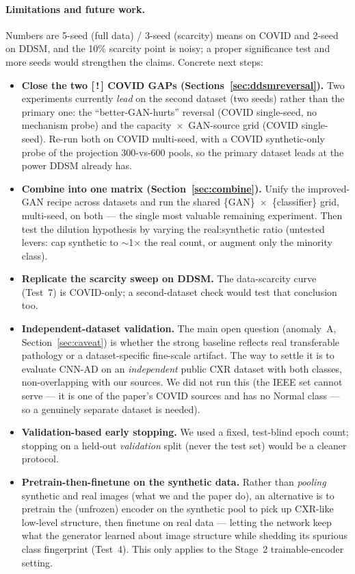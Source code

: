 \documentclass[11pt]{article}
\begin{document}
\paragraph{Limitations and future work.} Numbers are 5-seed (full data) / 3-seed
(scarcity) means on COVID and 2-seed on DDSM, and the 10\% scarcity point is noisy; a
proper significance test and more seeds would strengthen the claims. Concrete next
steps:
\begin{itemize}[nosep,leftmargin=1.4em]
  \item \textbf{Close the two [\,!\,] COVID GAPs (Sections~\ref{sec:ddsmreversal}).}
        Two experiments currently \emph{lead} on the second dataset (two seeds) rather
        than the primary one: the ``better-GAN-hurts'' reversal (COVID single-seed, no
        mechanism probe) and the capacity~$\times$~GAN-source grid (COVID single-seed).
        Re-run both on COVID multi-seed, with a COVID synthetic-only probe of the
        projection 300-vs-600 pools, so the primary dataset leads at the power DDSM
        already has.
  \item \textbf{Combine into one matrix (Section~\ref{sec:combine}).} Unify the
        improved-GAN recipe across datasets and run the shared \{GAN\}~$\times$~\{classifier\}
        grid, multi-seed, on both --- the single most valuable remaining experiment.
        Then test the dilution hypothesis by varying the real:synthetic ratio (untested
        levers: cap synthetic to $\sim$1$\times$ the real count, or augment only the
        minority class).
  \item \textbf{Replicate the scarcity sweep on DDSM.} The data-scarcity curve
        (Test~7) is COVID-only; a second-dataset check would test that conclusion too.
  \item \textbf{Independent-dataset validation.} The main open question (anomaly~A,
        Section~\ref{sec:caveat}) is whether the strong baseline reflects real
        transferable pathology or a dataset-specific fine-scale artifact. The way to
        settle it is to evaluate CNN-AD on an \emph{independent} public CXR dataset
        with both classes, non-overlapping with our sources. We did not run this
        (the IEEE set cannot serve --- it is one of the paper's COVID sources and
        has no Normal class --- so a genuinely separate dataset is needed).
  \item \textbf{Validation-based early stopping.} We used a fixed, test-blind epoch
        count; stopping on a held-out \emph{validation} split (never the test set)
        would be a cleaner protocol.
  \item \textbf{Pretrain-then-finetune on the synthetic data.} Rather than
        \emph{pooling} synthetic and real images (what we and the paper do), an
        alternative is to pretrain the (unfrozen) encoder on the synthetic pool to
        pick up CXR-like low-level structure, then finetune on real data ---
        letting the network keep what the generator learned about image structure
        while shedding its spurious class fingerprint (Test~4). This only applies to
        the Stage~2 trainable-encoder setting.
\end{itemize}
\end{document}
